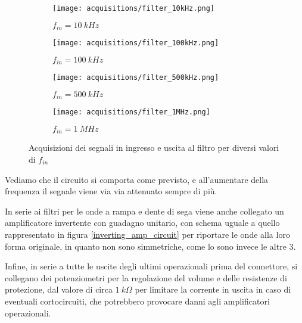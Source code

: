 \begin{figure}[H]
    \centering

    \begin{subfigure}{.5\textwidth}
        \centering
        \texttt{[image: acquisitions/filter\_10kHz.png]}
        \caption{$f_{in}=10\ kHz$}
        \label{acq_filter_10kHz}
    \end{subfigure}%
    \begin{subfigure}{.5\textwidth}
        \centering
        \texttt{[image: acquisitions/filter\_100kHz.png]}
        \caption{$f_{in}=100\ kHz$}
        \label{acq_filter_100kHz}
    \end{subfigure}
    \begin{subfigure}{.5\textwidth}
        \centering
        \texttt{[image: acquisitions/filter\_500kHz.png]}
        \caption{$f_{in}=500\ kHz$}
        \label{acq_filter_500kHz}
    \end{subfigure}%
    \begin{subfigure}{.5\textwidth}
        \centering
        \texttt{[image: acquisitions/filter\_1MHz.png]}
        \caption{$f_{in}=1\ MHz$}
        \label{acq_filter_MHz}
    \end{subfigure}

    \caption{Acquisizioni dei segnali in ingresso e uscita al filtro per diversi valori di $f_{in}$}
    \label{acq_filter}
\end{figure}

Vediamo che il circuito si comporta come previsto, e all'aumentare della frequenza il segnale
viene via via attenuato sempre di più.

In serie ai filtri per le onde a rampa e dente di sega viene anche collegato un amplificatore
invertente con guadagno unitario, con schema uguale a quello rappresentato in figura \ref{inverting_amp_circuit}
per riportare le onde alla loro forma originale, in quanto non sono simmetriche, come lo sono
invece le altre 3.

Infine, in serie a tutte le uscite degli ultimi operazionali prima del connettore, si collegano
dei potenziometri per la regolazione del volume e delle resistenze di protezione, dal valore
di circa $1\ k\Omega$ per limitare la corrente in uscita in caso di eventuali cortocircuiti,
che potrebbero provocare danni agli amplificatori operazionali.

